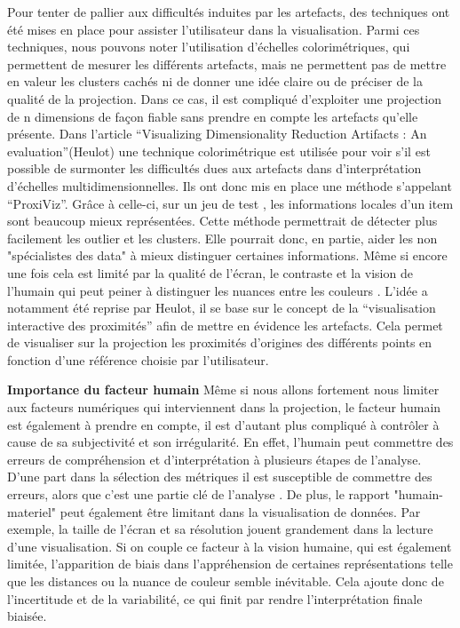 \smallskip
Pour tenter de pallier aux difficultés induites par les artefacts, des techniques ont été mises en place pour assister l’utilisateur dans la visualisation. Parmi ces techniques, nous pouvons noter l’utilisation d’échelles colorimétriques\cite{CheckViz}, qui permettent de mesurer les différents artefacts, mais ne permettent pas de mettre en valeur les clusters cachés ni de donner une idée claire ou de préciser de la qualité de la projection. Dans ce cas, il est compliqué d’exploiter une projection de n dimensions de façon fiable sans prendre en compte les artefacts qu’elle présente\cite{aupetit2007visualizing}.    
Dans l’article “Visualizing Dimensionality Reduction Artifacts : An evaluation”(Heulot) une technique colorimétrique est utilisée pour voir s’il est possible de surmonter les difficultés dues aux artefacts dans d’interprétation d’échelles multidimensionnelles. Ils ont donc mis en place une méthode s'appelant “ProxiViz”. Grâce à celle-ci, sur un jeu de test , les informations locales d’un item sont beaucoup mieux représentées. Cette méthode permettrait de détecter plus facilement les outlier et les clusters. Elle pourrait donc, en partie, aider les non "spécialistes des data" à mieux distinguer certaines informations. Même si encore une fois cela est limité par la qualité de l’écran, le contraste et la vision de l'humain qui peut peiner à distinguer les nuances entre les couleurs\cite{HeulotAnEvaluation} \cite{tran2021approaching} \cite{deering1998human_vision}.
L’idée a notamment été reprise par Heulot\cite{HeulotThese}, il se base sur le concept de la “visualisation interactive des proximités'' afin de mettre en évidence les artefacts. Cela permet de visualiser sur la projection les proximités d’origines des différents points en fonction d’une référence choisie par l’utilisateur.


\medskip
\textbf{Importance du facteur humain}
\newline Même si nous allons fortement nous limiter aux facteurs numériques qui interviennent dans la projection, le facteur humain est également à prendre en compte, il est d’autant plus compliqué à contrôler à cause de sa subjectivité et son irrégularité. En effet, l'humain peut commettre des erreurs de compréhension et d’interprétation à plusieurs étapes de l’analyse.
D’une part dans la sélection des métriques il est susceptible de commettre des erreurs, alors que c’est une partie clé de l'analyse \cite{barchard2011preventing}.
De plus, le rapport "humain-materiel" peut également être limitant dans la visualisation de données. Par exemple, la taille de l’écran et sa résolution jouent grandement dans la lecture d’une visualisation. Si on couple ce facteur à la vision humaine, qui est également limitée, l’apparition de biais dans l’appréhension de certaines représentations telle que les distances ou la nuance de couleur semble inévitable. Cela ajoute donc de l’incertitude et de la variabilité, ce qui finit par rendre l'interprétation finale biaisée.

